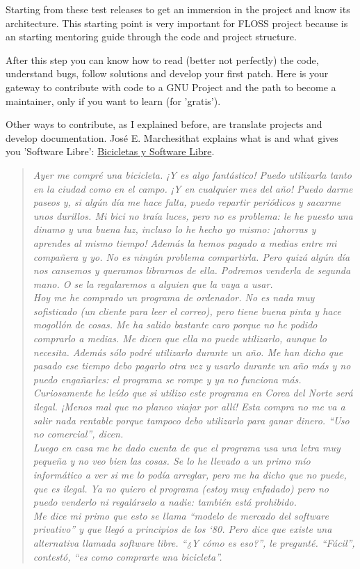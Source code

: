 \par Starting from these test releases to get an immersion in the project and know its architecture. This starting point is very important for FLOSS project because is an starting mentoring guide through the code and project structure.

\par After this step you can know how to read (better not perfectly) the code, understand bugs, follow solutions and develop your first patch. Here is your gateway to contribute with code to a GNU Project and the path to become a maintainer, only if you want to learn (for 'gratis').

\par Other ways to contribute, as I explained before, are translate projects and develop documentation. Jos\'e E. Marchesithat explains what is and what gives you 'Software Libre': \href{http://es.gnu.org/~jemarch/bicicletas.html}{Bicicletas y Software Libre}.

\begin{quotation}
    \emph{Ayer me compr\'e una bicicleta. ¡Y es algo fant\'astico! Puedo utilizarla tanto en la ciudad como en el campo. ¡Y en cualquier mes del año! Puedo darme paseos y, si alg\'un d\'ia me hace falta, puedo repartir peri\'odicos y sacarme unos durillos. Mi bici no tra\'ia luces, pero no es problema: le he puesto una dinamo y una buena luz, incluso lo he hecho yo mismo: ¡ahorras y aprendes al mismo tiempo! Adem\'as la hemos pagado a medias entre mi compañera y yo. No es ning\'un problema compartirla. Pero quiz\'a alg\'un d\'ia nos cansemos y queramos librarnos de ella. Podremos venderla de segunda mano. O se la regalaremos a alguien que la vaya a usar.
    \\ Hoy me he comprado un programa de ordenador. No es nada muy sofisticado (un cliente para leer el correo), pero tiene buena pinta y hace mogoll\'on de cosas. Me ha salido bastante caro porque no he podido comprarlo a medias. Me dicen que ella no puede utilizarlo, aunque lo necesita. Adem\'as s\'olo podr\'e utilizarlo durante un año. Me han dicho que pasado ese tiempo debo pagarlo otra vez y usarlo durante un año m\'as y no puedo engañarles: el programa se rompe y ya no funciona m\'as. Curiosamente he le\'ido que si utilizo este programa en Corea del Norte ser\'a ilegal. ¡Menos mal que no planeo viajar por all\'i! Esta compra no me va a salir nada rentable porque tampoco debo utilizarlo para ganar dinero. “Uso no comercial”, dicen.
    \\ Luego en casa me he dado cuenta de que el programa usa una letra muy pequeña y no veo bien las cosas. Se lo he llevado a un primo m\'io inform\'atico a ver si me lo pod\'ia arreglar, pero me ha dicho que no puede, que es ilegal. Ya no quiero el programa (estoy muy enfadado) pero no puedo venderlo ni regal\'arselo a nadie: tambi\'en est\'a prohibido.
    \\ Me dice mi primo que esto se llama “modelo de mercado del software privativo” y que lleg\'o a principios de los ‘80. Pero dice que existe una alternativa llamada software libre. “¿Y c\'omo es eso?”, le pregunt\'e. “F\'acil”, contest\'o, “es como comprarte una bicicleta”.}
\end{quotation}

